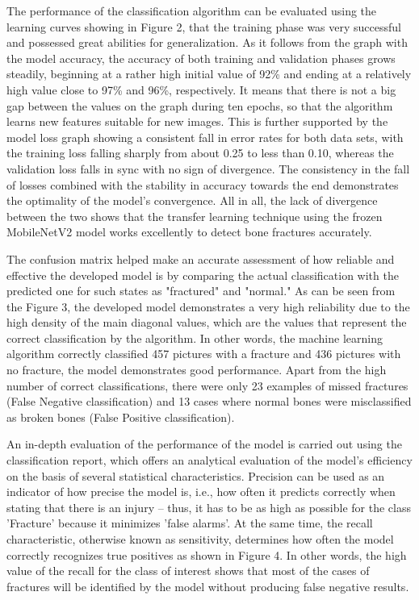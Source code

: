 \documentclass[conference]{IEEEtran}
\begin{document}
The performance of the classification algorithm can be evaluated using the learning curves showing in Figure 2, that the training phase was very successful and possessed great abilities for generalization. As it follows from the graph with the model accuracy, the accuracy of both training and validation phases grows steadily, beginning at a rather high initial value of 92\% and ending at a relatively high value close to 97\% and 96\%, respectively. It means that there is not a big gap between the values on the graph during ten epochs, so that the algorithm learns new features suitable for new images. This is further supported by the model loss graph showing a consistent fall in error rates for both data sets, with the training loss falling sharply from about 0.25 to less than 0.10, whereas the validation loss falls in sync with no sign of divergence. The consistency in the fall of losses combined with the stability in accuracy towards the end demonstrates the optimality of the model’s convergence. All in all, the lack of divergence between the two shows that the transfer learning technique using the frozen MobileNetV2 model works excellently to detect bone fractures accurately.


The confusion matrix helped make an accurate assessment of how reliable and effective the developed model is by comparing the actual classification with the predicted one for such states as "fractured" and "normal." As can be seen from the Figure 3, the developed model demonstrates a very high reliability due to the high density of the main diagonal values, which are the values that represent the correct classification by the algorithm. In other words, the machine learning algorithm correctly classified 457 pictures with a fracture and 436 pictures with no fracture, the model demonstrates good performance. Apart from the high number of correct classifications, there were only 23 examples of missed fractures (False Negative classification) and 13 cases where normal bones were misclassified as broken bones (False Positive classification).


An in-depth evaluation of the performance of the model is carried out using the classification report, which offers an analytical evaluation of the model’s efficiency on the basis of several statistical characteristics. Precision can be used as an indicator of how precise the model is, i.e., how often it predicts correctly when stating that there is an injury – thus, it has to be as high as possible for the class 'Fracture' because it minimizes 'false alarms'. At the same time, the recall characteristic, otherwise known as sensitivity, determines how often the model correctly recognizes true positives as shown in Figure 4. In other words, the high value of the recall for the class of interest shows that most of the cases of fractures will be identified by the model without producing false negative results. 
\end{document}
